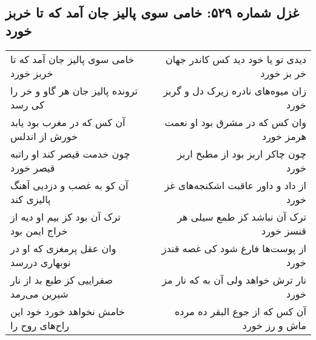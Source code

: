 \begin{center}
\section*{غزل شماره ۵۲۹: خامی سوی پالیز جان آمد که تا خربز خورد}
\label{sec:0529}
\begin{longtable}{l p{0.5cm} r}
خامی سوی پالیز جان آمد که تا خربز خورد
&&
دیدی تو یا خود دید کس کاندر جهان خر بز خورد
\\
ترونده پالیز جان هر گاو و خر را کی رسد
&&
زان میوه‌های نادره زیرک دل و گربز خورد
\\
آن کس که در مغرب بود یابد خورش از اندلس
&&
وان کس که در مشرق بود او نعمت هرمز خورد
\\
چون خدمت قیصر کند او راتبه قیصر خورد
&&
چون چاکر اربز بود از مطبخ اربز خورد
\\
آن کو به غصب و دزدیی آهنگ پالیزی کند
&&
از داد و داور عاقبت اشکنجه‌های غز خورد
\\
ترک آن بود کز بیم او دیه از خراج ایمن بود
&&
ترک آن نباشد کز طمع سیلی هر قنسز خورد
\\
وان عقل پرمغزی که او در نوبهاری دررسد
&&
از پوست‌ها فارغ شود کی غصه قندز خورد
\\
صفراییی کز طبع بد از نار شیرین می‌رمد
&&
نار ترش خواهد ولی آن به که نار مز خورد
\\
خامش نخواهد خورد خود این راح‌های روح را
&&
آن کس که از جوع البقر ده مرده ماش و رز خورد
\\
\end{longtable}
\end{center}
